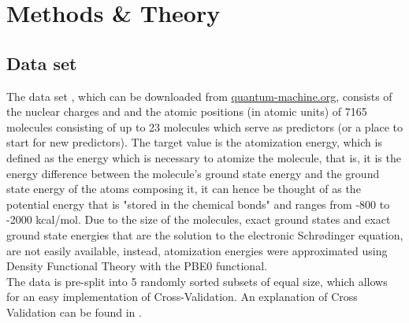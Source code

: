 \documentclass[11pt,a4paper,notitlepage]{article}
\begin{document}
\section{Methods \& Theory}
\subsection{Data set}
The data set \citep{blum,Atomization_Ridge}, which can be downloaded from \href{http://quantum-machine.org/datasets/}{quantum-machine.org}, consists of the nuclear charges  and and the atomic positions (in atomic units) of 7165 molecules consisting of up to 23 molecules which serve as predictors (or a place to start for new predictors). The target value is the atomization energy, which is defined as the energy which is necessary to atomize the molecule, that is, it is the energy difference between the molecule's ground state energy and the ground state energy of the atoms composing it, it can hence be thought of as the potential energy that is "stored in the chemical bonds" and ranges from -800 to -2000 kcal/mol. Due to the size of the molecules, exact ground states and exact ground state energies that are the solution to the electronic Schrødinger equation, are not easily available, instead, atomization energies were approximated using Density Functional Theory with the PBE0 functional. \\
The data is pre-split into 5 randomly sorted subsets of equal size, which allows for an easy implementation of Cross-Validation. An explanation of Cross Validation can be found in \citep{Project2}.
\end{document}
